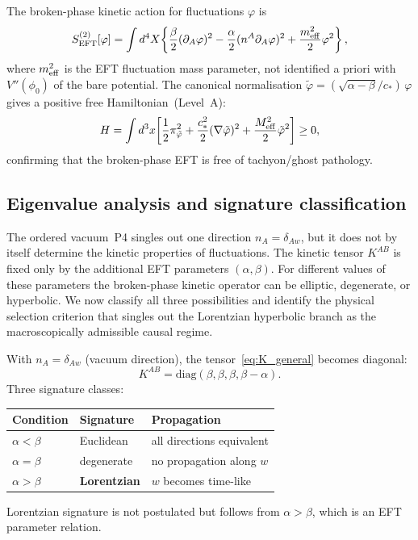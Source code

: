 \documentclass[11pt,a4paper]{article}
\numberwithin{equation}{section}
\begin{document}
The broken-phase kinetic action for fluctuations $\varphi$ is
\begin{equation}
  \label{eq:quadratic_action}
  S^{(2)}_{\rm EFT}[\varphi]
  = \int d^4X\!\left\{
    \frac{\beta}{2}(\partial_A\varphi)^2
    - \frac{\alpha}{2}(n^A\partial_A\varphi)^2
    + \frac{m_{\rm eff}^2}{2}\varphi^2
  \right\},
\end{equation}
where $m_{\rm eff}^2$ is the EFT fluctuation mass parameter,
not identified a priori with $V''(\phi_0)$ of the bare potential.
The canonical normalisation
$\tilde\varphi = (\sqrt{\alpha-\beta}/c_*)\,\varphi$ gives
a positive free Hamiltonian~(Level~A):
\begin{equation}
  \label{eq:H_free}
  H = \int d^3x\!\left[
    \frac{1}{2}\pi_{\tilde\varphi}^2
    + \frac{c_*^2}{2}(\nabla\tilde\varphi)^2
    + \frac{M_{\rm eff}^2}{2}\tilde\varphi^2
  \right] \geq 0,
\end{equation}
confirming that the broken-phase EFT is free of tachyon/ghost pathology.

\subsection{Eigenvalue analysis and signature classification}
\label{sec:metric_classification}

The ordered vacuum~P4 singles out one direction $n_A=\delta_{Aw}$, but
it does not by itself determine the kinetic properties of fluctuations.
The kinetic tensor $K^{AB}$ is fixed only by the additional EFT
parameters $(\alpha,\beta)$.  For different values of these parameters
the broken-phase kinetic operator can be elliptic, degenerate, or
hyperbolic.  We now classify all three possibilities and identify the
physical selection criterion that singles out the Lorentzian
hyperbolic branch as the macroscopically admissible causal regime.

With $n_A = \delta_{Aw}$ (vacuum direction), the tensor~\eqref{eq:K_general}
becomes diagonal:
\[
K^{AB} = \text{diag}(\beta,\beta,\beta,\beta-\alpha).
\]
Three signature classes:
\begin{center}
\renewcommand{\arraystretch}{1.3}
\begin{tabular}{lll}
\hline
Condition & Signature & Propagation \\
\hline
$\alpha < \beta$ & Euclidean & all directions equivalent \\
$\alpha = \beta$ & degenerate & no propagation along $w$ \\
$\alpha > \beta$ & \textbf{Lorentzian} & $w$ becomes time-like \\
\hline
\end{tabular}
\end{center}
Lorentzian signature is not postulated but follows from $\alpha>\beta$,
which is an EFT parameter relation.
\end{document}

